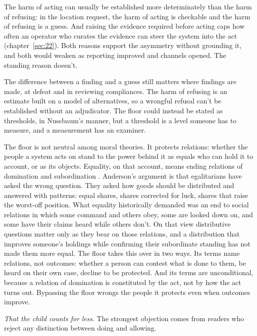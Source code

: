 The harm of acting can usually be established more determinately than the harm of refusing: in the location request, the harm of acting is checkable and the harm of refusing is a guess. And raising the evidence required before acting caps how often an operator who curates the evidence can steer the system into the act (chapter~\ref{sec:22}). Both reasons support the asymmetry without grounding it, and both would weaken as reporting improved and channels opened. The standing reason doesn't.

The difference between a finding and a guess still matters where findings are made, at defeat and in reviewing compliances. The harm of refusing is an estimate built on a model of alternatives, so a wrongful refusal can't be established without an adjudicator. The floor could instead be stated as thresholds, in Nussbaum's manner, but a threshold is a level someone has to measure, and a measurement has an examiner.

The floor is not neutral among moral theories. It protects relations: whether the people a system acts on stand to the power behind it as equals who can hold it to account, or as its objects. Equality, on that account, means ending relations of domination and subordination \autocite{anderson1999equality}. Anderson's argument is that egalitarians have asked the wrong question. They asked how goods should be distributed and answered with patterns: equal shares, shares corrected for luck, shares that raise the worst-off position. What equality historically demanded was an end to social relations in which some command and others obey, some are looked down on, and some have their claims heard while others don't. On that view distributive questions matter only as they bear on those relations, and a distribution that improves someone's holdings while confirming their subordinate standing has not made them more equal. The floor takes this over in two ways. Its terms name relations, not outcomes: whether a person can contest what is done to them, be heard on their own case, decline to be protected. And its terms are unconditional, because a relation of domination is constituted by the act, not by how the act turns out. Bypassing the floor wrongs the people it protects even when outcomes improve.


\emph{That the child counts for less.} The strongest objection comes from readers who reject any distinction between doing and allowing.

